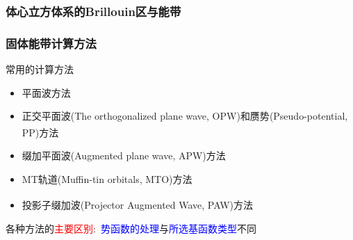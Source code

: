 \documentclass[cjk,slidestop,compress,mathserif,blue]{beamer}
\newcommand{\upcite}[1]{\hspace{0ex}\textsuperscript{\cite{#1}}} %
\begin{document}
\frame
{
	\frametitle{体心立方体系的\textrm{Brillouin}区与能带}
\vspace{10pt}
\begin{figure}[h!]
\centering
\hspace*{-0.30in}
\label{Band_Gap_BCC_GeF4}
\end{figure}
}

\frame
{
\frametitle{固体能带计算方法}
\vskip 10pt
常用的计算方法
\begin{itemize}%
\setlength{\itemsep}{12pt}
	\item	平面波方法
	\item	正交平面波\textrm{(The orthogonalized plane wave, OPW)}和赝势\textrm{(Pseudo-potential, PP)}方法\upcite{Singh_Book,PRB41-7892_1990,JPCM6-8245_1994}
	\item	缀加平面波\textrm{(Augmented plane wave, APW)}方法
	\item	\textrm{MT}轨道\textrm{(Muffin-tin orbitals, MTO)}方法
	\item	投影子缀加波\textrm{(Projector Augmented Wave, PAW)}方法\upcite{PRB50-17953_1994,PRB59-1758_1999}
\end{itemize}
\vskip 5pt 各种方法的\textcolor{red}{主要区别}:~\textcolor{blue}{势函数的处理}与\textcolor{blue}{所选基函数类型}不同
}
\end{document}
